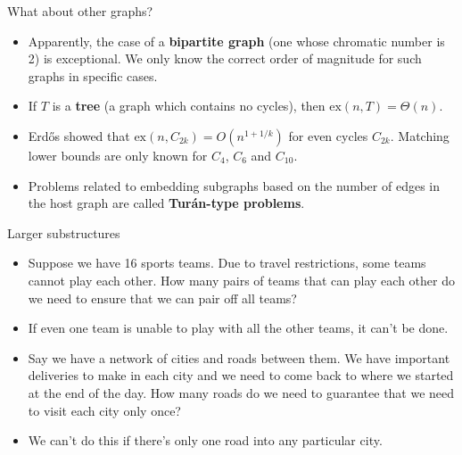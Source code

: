 \documentclass{beamer}
\theoremstyle{plain}
\begin{document}
	\begin{frame}{What about other graphs?}
		\begin{itemize}
			\item Apparently, the case of a \textbf{bipartite graph} (one whose chromatic number is 2) is exceptional.
			We only know the correct order of magnitude for such graphs in specific cases.

			\pause

			\item If $T$ is a \textbf{tree} (a graph which contains no cycles), then $\text{ex}(n, T) = \Theta(n)$.

			\pause

			\item Erd\H{os} showed that $\text{ex}(n, C_{2k})  = O(n^{1 + 1/k})$ for even cycles $C_{2k}$.
			Matching lower bounds are only known for $C_4$, $C_6$ and $C_{10}$.

			\pause

			\item Problems related to embedding subgraphs based on the number of edges in the host graph are called \textbf{Tur\'an-type problems}.
		\end{itemize}
	\end{frame}


	\begin{frame}{Larger substructures}
		\begin{itemize}
			\item Suppose we have 16 sports teams.
			Due to travel restrictions, some teams cannot play each other.
			How many pairs of teams that can play each other do we need to ensure that we can pair off all teams?

			\pause

			\item If even one team is unable to play with all the other teams, it can't be done.

			\pause

			\item Say we have a network of cities and roads between them.
			We have important deliveries to make in each city and we need to come back to where we started at the end of the day.
			How many roads do we need to guarantee that we need to visit each city only once?

			\pause

			\item We can't do this if there's only one road into any particular city.
		\end{itemize}
	\end{frame}
\end{document}
